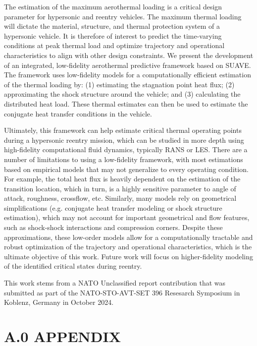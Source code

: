 \documentclass[%
 aip,
 amsmath,amssymb,
preprint,%
]{revtex4-1}
\begin{document}
The estimation of the maximum aerothermal loading is a critical design parameter for hypersonic and reentry vehicles. The maximum thermal loading will dictate the material, structure, and thermal protection system of a hypersonic vehicle. It is therefore of interest to predict the time-varying conditions at peak thermal load and optimize trajectory and operational characteristics to align with other design constraints. We present the development of an integrated, low-fidelity aerothermal predictive framework based on SUAVE. The framework uses low-fidelity models for a computationally efficient estimation of the thermal loading by: (1) estimating the stagnation point heat flux; (2) approximating the shock structure around the vehicle; and (3) calculating the distributed heat load. These thermal estimates can then be used to estimate the conjugate heat transfer conditions in the vehicle.

Ultimately, this framework can help estimate critical thermal operating points during a hypersonic reentry mission, which can be studied in more depth using high-fidelity computational fluid dynamics, typically RANS or LES. There are a number of limitations to using a low-fidelity framework, with most estimations based on empirical models that may not generalize to every operating condition. For example, the total heat flux is heavily dependent on the estimation of the transition location, which in turn, is a highly sensitive parameter to angle of attack, roughness, crossflow, etc. Similarly, many models rely on geometrical simplifications (e.g. conjugate heat transfer modeling or shock structure estimation), which may not account for important geometrical and flow features, such as shock-shock interactions and compression corners. Despite these approximations, these low-order models allow for a computationally tractable and robust optimization of the trajectory and operational characteristics, which is the ultimate objective of this work. Future work will focus on higher-fidelity modeling of the identified critical states during reentry.

%

\begin{acknowledgments}
This work stems from a NATO Unclassified report contribution that was submitted as part of the NATO-STO-AVT-SET 396 Resesarch Symposium in Koblenz, Germany in October 2024. 
\end{acknowledgments}

\appendix 
\section*{A.0 APPENDIX}
\end{document}
